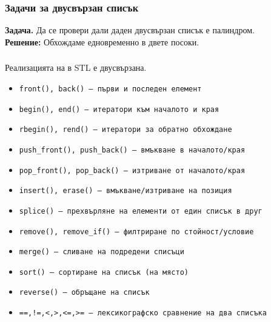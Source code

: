 \documentclass[alsotrans]{beamerswitch}
\begin{document}
\begin{frame}
  \frametitle{Задачи за двусвързан списък}

  \textbf{Задача.} Да се провери дали даден двусвързан списък е палиндром.\\[2ex]
  \pause
  \textbf{Решение:} Обхождаме едновременно в двете посоки.
\end{frame}

\begin{frame}
  \frametitle{}
  \footnotesize
  Реализацията на  в STL е двусвързана.
  \begin{itemize}
  \item \tt{front()}, \tt{back()} --- първи и последен елемент
  \item \tt{begin()}, \tt{end()} --- итератори към началото и края
  \item \tt{rbegin()}, \tt{rend()} --- итератори за обратно обхождане
  \item \tt{push\_front()}, \tt{push\_back()} --- вмъкване в началото/края
  \item \tt{pop\_front()}, \tt{pop\_back()} --- изтриване от началото/края
  \item \tt{insert()}, \tt{erase()} --- вмъкване/изтриване на позиция
  \item \tt{splice()} --- прехвърляне на елементи от един списък в друг
  \item \tt{remove()}, \tt{remove\_if()} --- филтриране по стойност/условие
  \item \tt{merge()} --- сливане на подредени списъци
  \item \tt{sort()} --- сортиране на списък (на място)
  \item \tt{reverse()} --- обръщане на списък
  \item \tt{==,!=,<,>,<=,>=} --- лексикографско сравнение на два списъка
  \end{itemize}
\end{frame}
\end{document}
